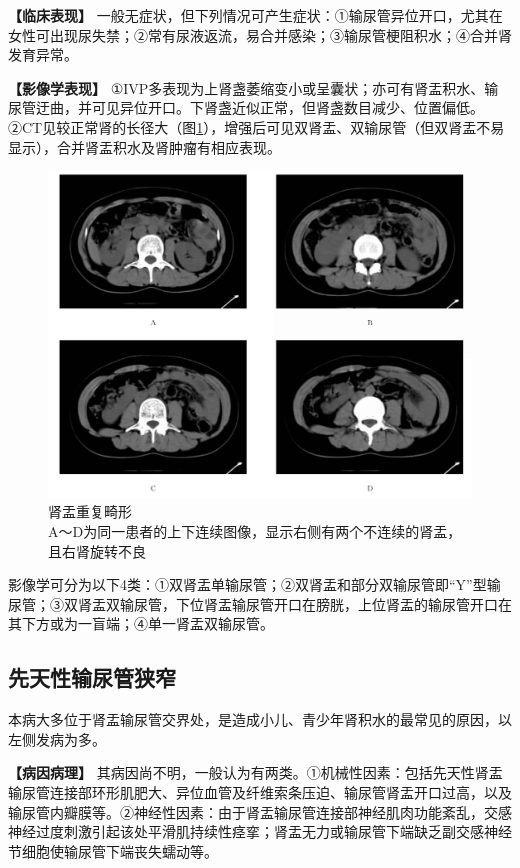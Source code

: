 \textbf{【临床表现】}
一般无症状，但下列情况可产生症状：①输尿管异位开口，尤其在女性可出现尿失禁；②常有尿液返流，易合并感染；③输尿管梗阻积水；④合并肾发育异常。

\textbf{【影像学表现】}
①IVP多表现为上肾盏萎缩变小或呈囊状；亦可有肾盂积水、输尿管迂曲，并可见异位开口。下肾盏近似正常，但肾盏数目减少、位置偏低。②CT见较正常肾的长径大（图\ref{fig15-5}），增强后可见双肾盂、双输尿管（但双肾盂不易显示），合并肾盂积水及肾肿瘤有相应表现。

\begin{figure}[!htbp]
 \centering
 \includegraphics[width=.7\textwidth,height=\textheight,keepaspectratio]{./images/Image00320.jpg}
 \captionsetup{justification=centering}
 \caption{肾盂重复畸形\\{\small A～D为同一患者的上下连续图像，显示右侧有两个不连续的肾盂，且右肾旋转不良}}
 \label{fig15-5}
  \end{figure} 

影像学可分为以下4类：①双肾盂单输尿管；②双肾盂和部分双输尿管即“Y”型输尿管；③双肾盂双输尿管，下位肾盂输尿管开口在膀胱，上位肾盂的输尿管开口在其下方或为一盲端；④单一肾盂双输尿管。

\subsection{先天性输尿管狭窄}

本病大多位于肾盂输尿管交界处，是造成小儿、青少年肾积水的最常见的原因，以左侧发病为多。

\textbf{【病因病理】}
其病因尚不明，一般认为有两类。①机械性因素：包括先天性肾盂输尿管连接部环形肌肥大、异位血管及纤维索条压迫、输尿管肾盂开口过高，以及输尿管内瓣膜等。②神经性因素：由于肾盂输尿管连接部神经肌肉功能紊乱，交感神经过度刺激引起该处平滑肌持续性痉挛；肾盂无力或输尿管下端缺乏副交感神经节细胞使输尿管下端丧失蠕动等。

